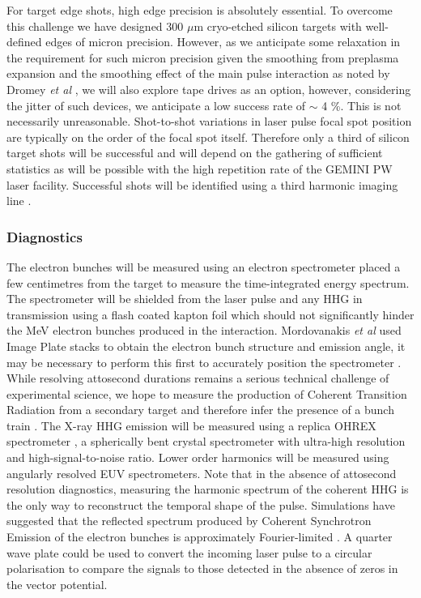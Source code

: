 For target edge shots, high edge precision is absolutely essential. To overcome this challenge we have designed 300 $\mu$m cryo-etched silicon targets with well-defined edges of micron precision. However, as we anticipate some relaxation in the requirement for such micron precision given the smoothing from preplasma expansion and the smoothing effect of the main pulse interaction as noted by Dromey \textit{et al} \cite{dromeyDiffractionlimitedPerformanceFocusing2009}, we will also explore tape drives as an option, however, considering the jitter of such devices, we anticipate a low success rate of $\sim$ 4 \%. This is not necessarily unreasonable. Shot-to-shot variations in laser pulse focal spot position are typically on the order of the focal spot itself. Therefore only a third of silicon target shots will be successful and will depend on the gathering of sufficient statistics as will be possible with the high repetition rate of the GEMINI PW laser facility. Successful shots will be identified using a third harmonic imaging line \cite{dromeyDiffractionlimitedPerformanceFocusing2009}. 

\subsubsection{Diagnostics}
The electron bunches will be measured using an electron spectrometer placed a few centimetres from the target to measure the time-integrated energy spectrum. The spectrometer will be shielded from the laser pulse and any \ac{HHG} in transmission using a flash coated kapton foil which should not significantly hinder the MeV electron bunches produced in the interaction. Mordovanakis \textit{et al} used Image Plate stacks to obtain the electron bunch structure and emission angle, it may be necessary to perform this first to accurately position the spectrometer \cite{mordovanakisQuasimonoenergeticElectronBeams2009}. While resolving attosecond durations remains a serious technical challenge of experimental science, we hope to measure the production of Coherent Transition Radiation from a secondary target and therefore infer the presence of a bunch train \cite{linIsolatedAttosecondElectron2020}. The X-ray \ac{HHG} emission will be measured using a replica OHREX spectrometer \cite{beiersdorferLineshapeSpectroscopyVery2016}, a spherically bent crystal spectrometer with ultra-high resolution and high-signal-to-noise ratio. Lower order harmonics will be measured using angularly resolved EUV spectrometers. Note that in the absence of attosecond resolution diagnostics, measuring the harmonic spectrum of the coherent \ac{HHG} is the only way to reconstruct the temporal shape of the pulse. Simulations have suggested that the reflected spectrum produced by Coherent Synchrotron Emission of the electron bunches is approximately Fourier-limited \cite{cousensElectronTrajectoriesAssociated2020}. A quarter wave plate could be used to convert the incoming laser pulse to a circular polarisation to compare the signals to those detected in the absence of zeros in the vector potential.

